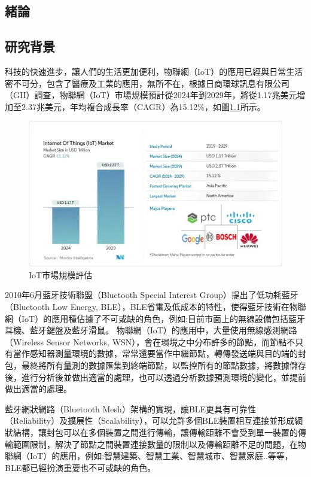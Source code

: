\begin{ZhChapter}

\chapter{緒論}

\section{研究背景}

科技的快速進步，讓人們的生活更加便利，物聯網（IoT）的應用已經與日常生活密不可分，包含了醫療及工業的應用，無所不在，\cite{mordor2024iot}根據日商環球訊息有限公司（GII）調查，物聯網（IoT）市場規模預計從2024年到2029年，將從1.17兆美元增加至2.37兆美元，年均複合成長率（CAGR）為15.12\%，如圖\ref{fig: IoT市場規模評估}所示。

\begin{figure}[H]
    \centering
    \includegraphics[width = 1\textwidth]{image/market_research.jpg}
    \caption{IoT市場規模評估\cite{mordor2024iot}}
    \label{fig: IoT市場規模評估}
\end{figure}

2010年6月藍牙技術聯盟（Bluetooth Special Interest Group）提出了低功耗藍牙（Bluetooth Low Energy, BLE），BLE省電及低成本的特性，使得藍牙技術在物聯網（IoT）的應用種佔據了不可或缺的角色，例如:目前市面上的無線設備包括藍牙耳機、藍牙鍵盤及藍牙滑鼠。
物聯網（IoT）的應用中，大量使用無線感測網路（Wireless Sensor Networks, WSN），會在環境之中分布許多的節點，而節點不只有當作感知器測量環境的數據，常常還要當作中繼節點，轉傳發送端與目的端的封包，最終將所有量測的數據匯集到終端節點，以監控所有的節點數據，將數據儲存後，進行分析後並做出適當的處理，也可以透過分析數據預測環境的變化，並提前做出適當的處理。

藍牙網狀網路（Bluetooth Mesh）架構的實現，讓BLE更具有可靠性（Reliability）及擴展性（Scalability），可以允許多個BLE裝置相互連接並形成網狀結構，讓封包可以在多個裝置之間進行傳輸，讓傳輸距離不會受到單一裝置的傳輸範圍限制，解決了節點之間裝置連接數量的限制以及傳輸距離不足的問題，在物聯網（IoT）的應用，例如:智慧建築、智慧工業、智慧城市、智慧家庭..等等，BLE都已經扮演重要也不可或缺的角色。
	

\end{ZhChapter}
